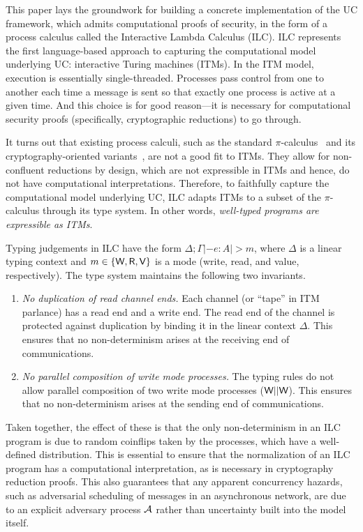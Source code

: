 This paper lays the groundwork for building a concrete implementation of the UC
framework, which admits computational proofs of security, in the form of a
process calculus called the Interactive Lambda Calculus (ILC). ILC represents
the first language-based approach to capturing the computational model
underlying UC: interactive Turing machines (ITMs). In the ITM model, execution
is essentially single-threaded. Processes pass control from one to another each
time a message is sent so that exactly one process is active at a given
time. And this choice is for good reason---it is necessary for computational
security proofs (specifically, cryptographic reductions) to go through.

It turns out that existing process calculi, such as the standard
$\pi$-calculus~\cite{milner1999communicating} and its cryptography-oriented
variants~\cite{abadi1999calculus, abadi2001mobile}, are not a good fit to
ITMs. They allow for non-confluent reductions by design, which are not
expressible in ITMs and hence, do not have computational interpretations.
Therefore, to faithfully capture the computational model underlying UC, ILC
adapts ITMs to a subset of the $\pi$-calculus through its type system. In other
words, \emph{well-typed programs are expressible as ITMs}.

Typing judgements in ILC have the form $\Delta ; \Gamma |- e : A |> m$, where $\Delta$ is a
linear typing context and $m \in \{\textsf{W}, \textsf{R}, \textsf{V}\}$ is a mode (write, read, and
value, respectively). The type system maintains the following two invariants.
\begin{enumerate}[leftmargin=*]
\item \emph{No duplication of read channel ends.} Each channel (or ``tape'' in
  ITM parlance) has a read end and a write end. The read end of the channel is
  protected against duplication by binding it in the linear context $\Delta$. This
  ensures that no non-determinism arises at the receiving end of communications.

\item \emph{No parallel composition of write mode processes.} The typing rules
  do not allow parallel composition of two write mode processes ($\textsf{W} ||
  \textsf{W}$). This ensures that no non-determinism arises at the sending end of
  communications.
\end{enumerate}

Taken together, the effect of these is that the only non-determinism in an ILC
program is due to random coinflips taken by the processes, which have a
well-defined distribution. This is essential to ensure that the normalization of
an ILC program has a computational interpretation, as is necessary in
cryptography reduction proofs. This also guarantees that any apparent
concurrency hazards, such as adversarial scheduling of messages in an
asynchronous network, are due to an explicit adversary process $\mathcal{{A}}$ rather
than uncertainty built into the model itself.

